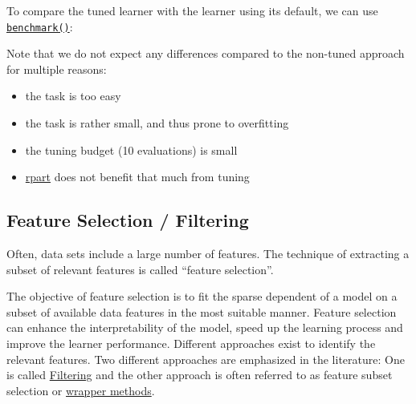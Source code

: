 \documentclass[]{article}
\newenvironment{Shaded}{}{}
\newcommand{\DataTypeTok}[1]{#1}
\newcommand{\DecValTok}[1]{#1}
\newcommand{\KeywordTok}[1]{\textcolor[rgb]{0.00,0.00,1.00}{#1}}
\newcommand{\NormalTok}[1]{#1}
\newcommand{\OperatorTok}[1]{#1}
\newcommand{\StringTok}[1]{\textcolor[rgb]{0.00,0.50,0.50}{#1}}
\providecommand{\tightlist}{%
  \setlength{\itemsep}{0pt}\setlength{\parskip}{0pt}}
\renewenvironment{Shaded} {\begin{snugshade}\small} {\end{snugshade}}
\begin{document}
To compare the tuned learner with the learner using its default, we can use \href{https://mlr3.mlr-org.com/reference/benchmark.html}{\texttt{benchmark()}}:

\begin{Shaded}
\end{Shaded}

Note that we do not expect any differences compared to the non-tuned approach for multiple reasons:

\begin{itemize}
\tightlist
\item
  the task is too easy
\item
  the task is rather small, and thus prone to overfitting
\item
  the tuning budget (10 evaluations) is small
\item
  \href{https://cran.r-project.org/package=rpart}{rpart} does not benefit that much from tuning
\end{itemize}

\hypertarget{fs}{%
\subsection{Feature Selection / Filtering}\label{fs}}

Often, data sets include a large number of features.
The technique of extracting a subset of relevant features is called ``feature selection''.

The objective of feature selection is to fit the sparse dependent of a model on a subset of available data features in the most suitable manner.
Feature selection can enhance the interpretability of the model, speed up the learning process and improve the learner performance.
Different approaches exist to identify the relevant features.
Two different approaches are emphasized in the literature:
One is called \protect\hyperlink{fs-filtering}{Filtering} and the other approach is often referred to as feature subset selection or \protect\hyperlink{fs-wrapper}{wrapper methods}.
\end{document}
